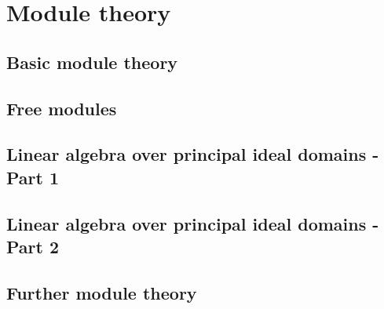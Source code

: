 \part{Module theory}\label{module theory}

\chapter{Basic module theory}
    
    
    
    
    
    

\chapter{Free modules}
    
    
\chapter{Linear algebra over principal ideal domains - Part 1}
    
    
    
    
    

\chapter{Linear algebra over principal ideal domains - Part 2}
    
    
    
    

\chapter{Further module theory}
    
    
    
